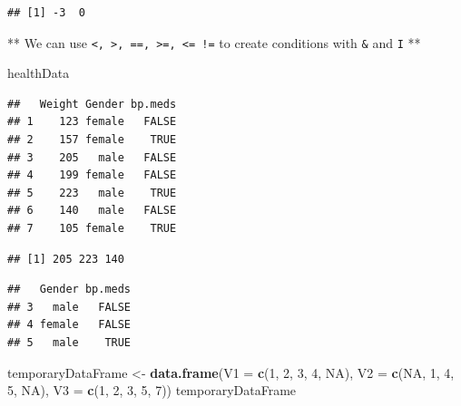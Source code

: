 \documentclass[]{article}
\newenvironment{Shaded}{\begin{snugshade}}{\end{snugshade}}
\newcommand{\KeywordTok}[1]{\textcolor[rgb]{0.13,0.29,0.53}{\textbf{#1}}}
\newcommand{\DataTypeTok}[1]{\textcolor[rgb]{0.13,0.29,0.53}{#1}}
\newcommand{\DecValTok}[1]{\textcolor[rgb]{0.00,0.00,0.81}{#1}}
\newcommand{\StringTok}[1]{\textcolor[rgb]{0.31,0.60,0.02}{#1}}
\newcommand{\OtherTok}[1]{\textcolor[rgb]{0.56,0.35,0.01}{#1}}
\newcommand{\OperatorTok}[1]{\textcolor[rgb]{0.81,0.36,0.00}{\textbf{#1}}}
\newcommand{\NormalTok}[1]{#1}
\begin{document}
\begin{verbatim}
## [1] -3  0
\end{verbatim}

** We can use
\texttt{\textless{},\ \textgreater{},\ ==,\ \textgreater{}=,\ \textless{}=\ !=}
to create conditions with \texttt{\&} and \texttt{I} **

\begin{Shaded}
\begin{Highlighting}[]
\NormalTok{healthData}
\end{Highlighting}
\end{Shaded}

\begin{verbatim}
##   Weight Gender bp.meds
## 1    123 female   FALSE
## 2    157 female    TRUE
## 3    205   male   FALSE
## 4    199 female   FALSE
## 5    223   male    TRUE
## 6    140   male   FALSE
## 7    105 female    TRUE
\end{verbatim}

\begin{Shaded}
\end{Shaded}

\begin{verbatim}
## [1] 205 223 140
\end{verbatim}

\begin{Shaded}
\end{Shaded}

\begin{verbatim}
##   Gender bp.meds
## 3   male   FALSE
## 4 female   FALSE
## 5   male    TRUE
\end{verbatim}

\begin{Shaded}
\begin{Highlighting}[]
\NormalTok{temporaryDataFrame <-}\StringTok{ }\KeywordTok{data.frame}\NormalTok{(}\DataTypeTok{V1 =} \KeywordTok{c}\NormalTok{(}\DecValTok{1}\NormalTok{, }\DecValTok{2}\NormalTok{, }\DecValTok{3}\NormalTok{, }\DecValTok{4}\NormalTok{, }\OtherTok{NA}\NormalTok{), }\DataTypeTok{V2 =} \KeywordTok{c}\NormalTok{(}\OtherTok{NA}\NormalTok{, }\DecValTok{1}\NormalTok{, }\DecValTok{4}\NormalTok{, }\DecValTok{5}\NormalTok{, }\OtherTok{NA}\NormalTok{), }\DataTypeTok{V3 =} \KeywordTok{c}\NormalTok{(}\DecValTok{1}\NormalTok{, }\DecValTok{2}\NormalTok{, }\DecValTok{3}\NormalTok{, }\DecValTok{5}\NormalTok{, }\DecValTok{7}\NormalTok{))}
\NormalTok{temporaryDataFrame}
\end{Highlighting}
\end{Shaded}
\end{document}
